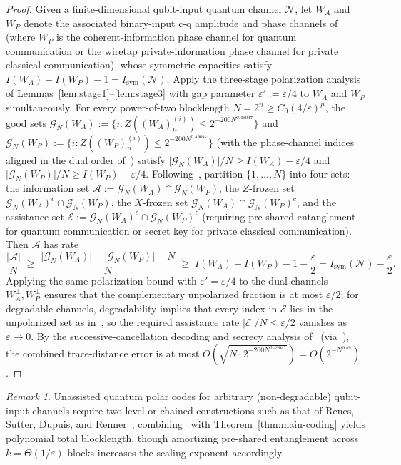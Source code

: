 \documentclass[10pt,a4paper]{article}
\numberwithin{equation}{section}
\theoremstyle{plain}
\theoremstyle{definition}
\theoremstyle{remark}
\newtheorem*{remark}{Remark}
\newcommand{\cN}{\mathcal{N}}
\newcommand{\cE}{\mathcal{E}}
\newcommand{\cG}{\mathcal{G}}
\newcommand{\cA}{\mathcal{A}}
\begin{document}
\begin{proof}
Given a finite-dimensional qubit-input quantum channel $\cN$, let $W_A$ and $W_P$ denote the associated binary-input c-q amplitude and phase channels of~\cite{RenesWilde2014} (where $W_P$ is the coherent-information phase channel for quantum communication or the wiretap private-information phase channel for private classical communication), whose symmetric capacities satisfy $I(W_A) + I(W_P) - 1 = I_{\mathrm{sym}}(\cN)$. Apply the three-stage polarization analysis of Lemmas~\ref{lem:stage1}--\ref{lem:stage3} with gap parameter $\varepsilon' := \varepsilon/4$ to $W_A$ and $W_P$ simultaneously. For every power-of-two blocklength $N = 2^n \ge C_0(4/\varepsilon)^{\mu}$, the good sets $\cG_N(W_A) := \{i : Z((W_A)_n^{(i)}) \le 2^{-200 N^{0.49047}}\}$ and $\cG_N(W_P) := \{i : Z((W_P)_n^{(i)}) \le 2^{-200 N^{0.49047}}\}$ (with the phase-channel indices aligned in the dual order of~\cite{RenesWilde2014}) satisfy $\lvert \cG_N(W_A) \rvert / N \ge I(W_A) - \varepsilon/4$ and $\lvert \cG_N(W_P) \rvert / N \ge I(W_P) - \varepsilon/4$. Following~\cite{RenesWilde2014}, partition $\{1, \ldots, N\}$ into four sets: the information set $\cA := \cG_N(W_A) \cap \cG_N(W_P)$, the $Z$-frozen set $\cG_N(W_A)^c \cap \cG_N(W_P)$, the $X$-frozen set $\cG_N(W_A) \cap \cG_N(W_P)^c$, and the assistance set $\cE := \cG_N(W_A)^c \cap \cG_N(W_P)^c$ (requiring pre-shared entanglement for quantum communication or secret key for private classical communication). Then $\cA$ has rate
\[
\frac{\lvert \cA \rvert}{N} \;\ge\; \frac{\lvert \cG_N(W_A) \rvert + \lvert \cG_N(W_P) \rvert - N}{N} \;\ge\; I(W_A) + I(W_P) - 1 - \frac{\varepsilon}{2} = I_{\mathrm{sym}}(\cN) - \frac{\varepsilon}{2}.
\]
Applying the same polarization bound with $\varepsilon' = \varepsilon/4$ to the dual channels $W_A^{\perp}, W_P^{\perp}$ ensures that the complementary unpolarized fraction is at most $\varepsilon/2$; for degradable channels, degradability implies that every index in $\cE$ lies in the unpolarized set as in~\cite{RenesWilde2014}, so the required assistance rate $\lvert \cE \rvert / N \le \varepsilon/2$ vanishes as $\varepsilon \to 0$. By the successive-cancellation decoding and secrecy analysis of~\cite{RenesWilde2014} (via~\cite[Proposition~4]{WildeGuha2013}), the combined trace-distance error is at most $O(\sqrt{N \cdot 2^{-200 N^{0.49047}}}) = O(2^{-N^{0.49}})$.
\end{proof}

\begin{remark}
Unassisted quantum polar codes for arbitrary (non-degradable) qubit-input channels require two-level or chained constructions such as that of Renes, Sutter, Dupuis, and Renner~\cite{RenesSutterDupuisRenner2015}; combining~\cite{RenesSutterDupuisRenner2015} with Theorem~\ref{thm:main-coding} yields polynomial total blocklength, though amortizing pre-shared entanglement across $k = \Theta(1/\varepsilon)$ blocks increases the scaling exponent accordingly.
\end{remark}
\end{document}
